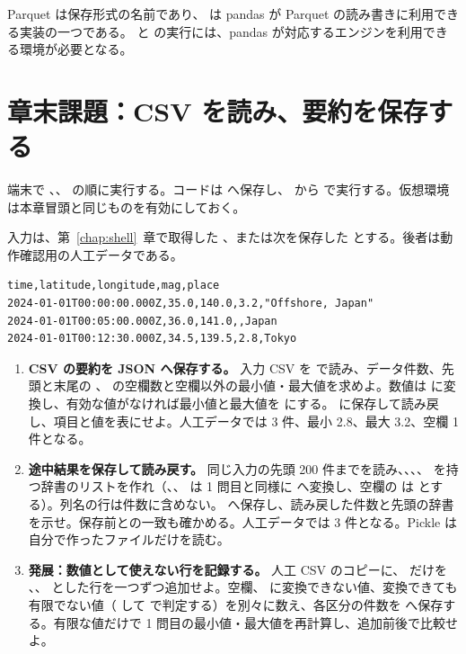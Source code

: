 Parquet は保存形式の名前であり、 は pandas が Parquet の読み書きに利用できる実装の一つである。 と  の実行には、pandas が対応するエンジンを利用できる環境が必要となる。

\section{章末課題：CSV を読み、要約を保存する}

端末で 、、 の順に実行する。コードは  へ保存し、 から  で実行する。仮想環境は本章冒頭と同じものを有効にしておく。

入力は、第~\ref{chap:shell}~章で取得した 、または次を保存した  とする。後者は動作確認用の人工データである。

\begin{lstlisting}[numbers=none, xleftmargin=2\zw, title={raw/usgs\_example.csv}]
time,latitude,longitude,mag,place
2024-01-01T00:00:00.000Z,35.0,140.0,3.2,"Offshore, Japan"
2024-01-01T00:05:00.000Z,36.0,141.0,,Japan
2024-01-01T00:12:30.000Z,34.5,139.5,2.8,Tokyo
\end{lstlisting}

\begin{enumerate}
\item \textbf{CSV の要約を JSON へ保存する。}
入力 CSV を  で読み、データ件数、先頭と末尾の 、 の空欄数と空欄以外の最小値・最大値を求めよ。数値は  に変換し、有効な値がなければ最小値と最大値を  にする。 に保存して読み戻し、項目と値を表にせよ。人工データでは 3 件、最小 2.8、最大 3.2、空欄 1 件となる。

\item \textbf{途中結果を保存して読み戻す。}
同じ入力の先頭 200 件までを読み、、、、 を持つ辞書のリストを作れ（、、 は 1 問目と同様に  へ変換し、空欄の  は  とする）。列名の行は件数に含めない。 へ保存し、読み戻した件数と先頭の辞書を示せ。保存前との一致も確かめる。人工データでは 3 件となる。Pickle は自分で作ったファイルだけを読む。

\item \textbf{発展：数値として使えない行を記録する。}
人工 CSV のコピーに、 だけを 、、 とした行を一つずつ追加せよ。空欄、 に変換できない値、変換できても有限でない値（ して  で判定する）を別々に数え、各区分の件数を  へ保存する。有限な値だけで 1 問目の最小値・最大値を再計算し、追加前後で比較せよ。

\end{enumerate}
